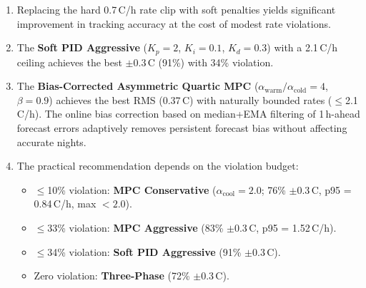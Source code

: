 \documentclass[11pt]{article}
\begin{document}
\begin{enumerate}
  \item Replacing the hard 0.7\,\textdegree C/h rate clip with soft penalties
    yields significant improvement in tracking accuracy at the cost of
    modest rate violations.

  \item The \textbf{Soft PID Aggressive} ($K_p = 2$, $K_i = 0.1$, $K_d = 0.3$)
    with a 2.1\,\textdegree C/h ceiling achieves the best $\pm$0.3\,\textdegree C
    (91\%) with 34\% violation.

  \item The \textbf{Bias-Corrected Asymmetric Quartic MPC}
    ($\alpha_\mathrm{warm}/\alpha_\mathrm{cold}=4$, $\beta=0.9$) achieves
    the best RMS (0.37\,\textdegree C) with naturally bounded rates
    ($\leq$2.1\,\textdegree C/h).  The online bias correction based on
    median+EMA filtering of 1\,h-ahead forecast errors adaptively removes
    persistent forecast bias without affecting accurate nights.

  \item The practical recommendation depends on the violation budget:
    \begin{itemize}
      \item $\leq$10\% violation: \textbf{MPC Conservative}
        ($\alpha_\mathrm{cool}=2.0$; 76\% $\pm$0.3\,\textdegree C,
        p95 = 0.84\,\textdegree C/h, max $< 2.0$).
      \item $\leq$33\% violation: \textbf{MPC Aggressive}
        (83\% $\pm$0.3\,\textdegree C, p95 = 1.52\,\textdegree C/h).
      \item $\leq$34\% violation: \textbf{Soft PID Aggressive}
        (91\% $\pm$0.3\,\textdegree C).
      \item Zero violation: \textbf{Three-Phase}
        (72\% $\pm$0.3\,\textdegree C).
    \end{itemize}
\end{enumerate}
\end{document}

